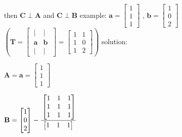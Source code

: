 \documentclass[12pt, a4paper]{article}
\begin{document}
{\qquad then ${\mathbf{C}} \perp {\mathbf{A}}$ and ${\mathbf{C}} \perp {\mathbf{B}}$
\vspace{31pt}
\newline
example: 
\begin{math}
	{\mathbf{a}} = 
	\begin{bmatrix}
		1 \\
		1 \\
		1 
	\end{bmatrix}
\end{math}
, 
\begin{math}
	{\mathbf{b}} = 
	\begin{bmatrix}
		1 \\
		0 \\
		2 
	\end{bmatrix}
\end{math}
\begin{math}
	\left(
	{\mathbf{T}} = 
	\begin{bmatrix}
		\ | & | \ \\
		\ {\mathbf{a}} & {\mathbf{b}} \ \\
		\ | & | \ 
	\end{bmatrix}
	 = 
	\begin{bmatrix}
		1 & 1 \\
		1 & 0 \\
		1 & 2 
	\end{bmatrix}
	\right)
\end{math}
\newline
solution:
\par 
\begin{math}
	{\mathbf{A}} = {\mathbf{a}} = 
	\begin{bmatrix}
		1 \\
		1 \\
		1 
	\end{bmatrix}
\end{math}
\par 
\begin{math}
	{\mathbf{B}} = 
	\begin{bmatrix}
		1 \\
		0 \\
		2 
	\end{bmatrix}
	 - 
	\cfrac{
		\begin{bmatrix}
			1 & 1 & 1 \\
			1 & 1 & 1 \\
			1 & 1 & 1 
		\end{bmatrix}
	}
	{
		\begin{bmatrix}
			1 & 1 & 1 
		\end{bmatrix}
}
\end{math}}
\end{document}
